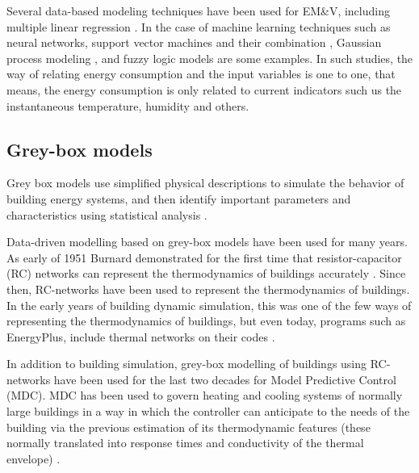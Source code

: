\documentclass[10pt, conference, compsocconf]{IEEEtran}
\begin{document}
Several data-based modeling techniques have been used for EM\&V, including multiple linear regression \cite{braun2014using}.  %
In the case of machine learning techniques such as neural networks, support vector machines and their combination \cite{ahmad2014review}, Gaussian process modeling \cite{heo2012gaussian}, and fuzzy logic models \cite{ciabattoni2014fuzzy} are some examples. In such studies, the way of relating energy consumption and the input variables is one to one, that means, the energy consumption is only related to current indicators such us the instantaneous temperature, humidity and others. 
  

\subsection{Grey-box models}

Grey box models use simplified physical descriptions to simulate the behavior of building energy systems, and then identify important parameters and characteristics using statistical analysis \cite{handbook2017american}.

Data-driven modelling based on grey-box models have been used for many years. As early of 1951 Burnard demonstrated for the first time that resistor-capacitor (RC) networks can represent the thermodynamics of buildings accurately \cite{burnand1952study}. Since then, RC-networks have been used to represent the thermodynamics of buildings. In the early years of building dynamic simulation, this was one of the few ways of representing the thermodynamics of buildings, but even today, programs such as EnergyPlus, include thermal networks on their codes \cite{handbook2017american} .

In addition to building simulation, grey-box modelling of buildings using RC-networks have been used for the last two decades for Model Predictive Control (MDC). MDC has been used to govern heating and cooling systems of normally large buildings in a way in which the controller can anticipate to the needs of the building via the previous estimation of its thermodynamic features (these normally translated into response times and conductivity of the thermal envelope) \cite{coley1992second}.
\end{document}
